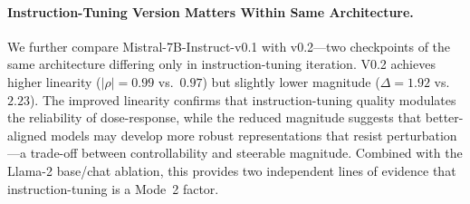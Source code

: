 \documentclass{article}
\begin{document}
\paragraph{Instruction-Tuning Version Matters Within Same Architecture.}\label{sec:mistral_compare}
We further compare Mistral-7B-Instruct-v0.1 with v0.2---two checkpoints of the same architecture differing only in instruction-tuning iteration. V0.2 achieves higher linearity ($|\rho|{=}0.99$ vs.\ $0.97$) but slightly lower magnitude ($\Delta{=}1.92$ vs.\ $2.23$). The improved linearity confirms that instruction-tuning quality modulates the reliability of dose-response, while the reduced magnitude suggests that better-aligned models may develop more robust representations that resist perturbation---a trade-off between controllability and steerable magnitude. Combined with the Llama-2 base/chat ablation, this provides two independent lines of evidence that instruction-tuning is a Mode~2 factor.
\end{document}
